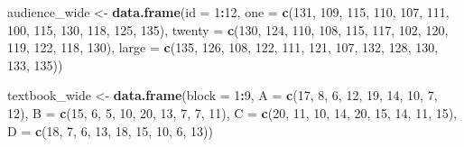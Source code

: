 \documentclass[]{article}
\newenvironment{Shaded}{\begin{snugshade}}{\end{snugshade}}
\newcommand{\KeywordTok}[1]{\textcolor[rgb]{0.13,0.29,0.53}{\textbf{#1}}}
\newcommand{\DataTypeTok}[1]{\textcolor[rgb]{0.13,0.29,0.53}{#1}}
\newcommand{\DecValTok}[1]{\textcolor[rgb]{0.00,0.00,0.81}{#1}}
\newcommand{\StringTok}[1]{\textcolor[rgb]{0.31,0.60,0.02}{#1}}
\newcommand{\OperatorTok}[1]{\textcolor[rgb]{0.81,0.36,0.00}{\textbf{#1}}}
\newcommand{\NormalTok}[1]{#1}
\begin{document}
\begin{Shaded}
\begin{Highlighting}[]
\NormalTok{audience_wide <-}\StringTok{ }\KeywordTok{data.frame}\NormalTok{(}\DataTypeTok{id     =} \DecValTok{1}\OperatorTok{:}\DecValTok{12}\NormalTok{,}
                            \DataTypeTok{one    =} \KeywordTok{c}\NormalTok{(}\DecValTok{131}\NormalTok{, }\DecValTok{109}\NormalTok{, }\DecValTok{115}\NormalTok{, }\DecValTok{110}\NormalTok{, }\DecValTok{107}\NormalTok{, }\DecValTok{111}\NormalTok{, }
                                       \DecValTok{100}\NormalTok{, }\DecValTok{115}\NormalTok{, }\DecValTok{130}\NormalTok{, }\DecValTok{118}\NormalTok{, }\DecValTok{125}\NormalTok{, }\DecValTok{135}\NormalTok{),}
                            \DataTypeTok{twenty =} \KeywordTok{c}\NormalTok{(}\DecValTok{130}\NormalTok{, }\DecValTok{124}\NormalTok{, }\DecValTok{110}\NormalTok{, }\DecValTok{108}\NormalTok{, }\DecValTok{115}\NormalTok{, }\DecValTok{117}\NormalTok{, }
                                       \DecValTok{102}\NormalTok{, }\DecValTok{120}\NormalTok{, }\DecValTok{119}\NormalTok{, }\DecValTok{122}\NormalTok{, }\DecValTok{118}\NormalTok{, }\DecValTok{130}\NormalTok{),}
                            \DataTypeTok{large  =} \KeywordTok{c}\NormalTok{(}\DecValTok{135}\NormalTok{, }\DecValTok{126}\NormalTok{, }\DecValTok{108}\NormalTok{, }\DecValTok{122}\NormalTok{, }\DecValTok{111}\NormalTok{, }\DecValTok{121}\NormalTok{, }
                                       \DecValTok{107}\NormalTok{, }\DecValTok{132}\NormalTok{, }\DecValTok{128}\NormalTok{, }\DecValTok{130}\NormalTok{, }\DecValTok{133}\NormalTok{, }\DecValTok{135}\NormalTok{))}

\NormalTok{textbook_wide <-}\StringTok{ }\KeywordTok{data.frame}\NormalTok{(}\DataTypeTok{block =} \DecValTok{1}\OperatorTok{:}\DecValTok{9}\NormalTok{,}
                            \DataTypeTok{A =} \KeywordTok{c}\NormalTok{(}\DecValTok{17}\NormalTok{,  }\DecValTok{8}\NormalTok{,  }\DecValTok{6}\NormalTok{, }\DecValTok{12}\NormalTok{, }\DecValTok{19}\NormalTok{, }\DecValTok{14}\NormalTok{, }\DecValTok{10}\NormalTok{,  }\DecValTok{7}\NormalTok{, }\DecValTok{12}\NormalTok{),}
                            \DataTypeTok{B =} \KeywordTok{c}\NormalTok{(}\DecValTok{15}\NormalTok{,  }\DecValTok{6}\NormalTok{,  }\DecValTok{5}\NormalTok{, }\DecValTok{10}\NormalTok{, }\DecValTok{20}\NormalTok{, }\DecValTok{13}\NormalTok{,  }\DecValTok{7}\NormalTok{,  }\DecValTok{7}\NormalTok{, }\DecValTok{11}\NormalTok{),}
                            \DataTypeTok{C =} \KeywordTok{c}\NormalTok{(}\DecValTok{20}\NormalTok{, }\DecValTok{11}\NormalTok{, }\DecValTok{10}\NormalTok{, }\DecValTok{14}\NormalTok{, }\DecValTok{20}\NormalTok{, }\DecValTok{15}\NormalTok{, }\DecValTok{14}\NormalTok{, }\DecValTok{11}\NormalTok{, }\DecValTok{15}\NormalTok{),}
                            \DataTypeTok{D =} \KeywordTok{c}\NormalTok{(}\DecValTok{18}\NormalTok{,  }\DecValTok{7}\NormalTok{,  }\DecValTok{6}\NormalTok{, }\DecValTok{13}\NormalTok{, }\DecValTok{18}\NormalTok{, }\DecValTok{15}\NormalTok{, }\DecValTok{10}\NormalTok{,  }\DecValTok{6}\NormalTok{, }\DecValTok{13}\NormalTok{))}


\end{Highlighting}
\end{Shaded}
\end{document}

